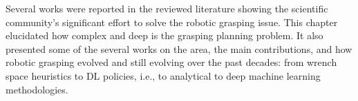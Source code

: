 Several works were reported in the reviewed literature showing the scientific community's significant effort to solve the robotic grasping issue. This chapter elucidated how complex and deep is the grasping planning problem. It also presented some of the several works on the area, the main contributions, and how robotic grasping evolved and still evolving over the past decades: from wrench space heuristics to {DL} policies, i.e., to analytical to deep machine learning methodologies. 








